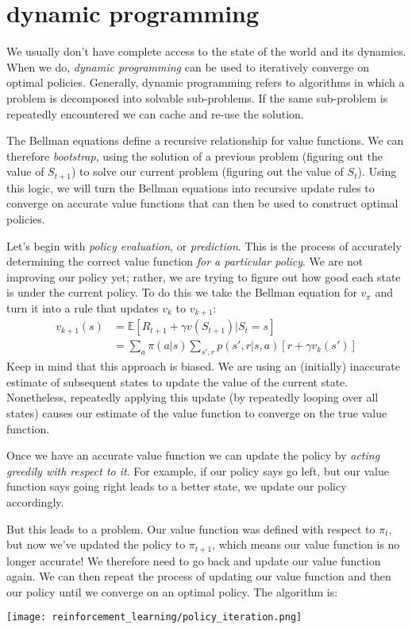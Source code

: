 \section{dynamic programming}
We usually don't have complete access to the state of the world and its dynamics. When we do, \textit{dynamic programming} can be used to iteratively converge on optimal policies. Generally, dynamic programming refers to algorithms in which a problem is decomposed into solvable sub-problems. If the same sub-problem is repeatedly encountered we can cache and re-use the solution.

The Bellman equations define a recursive relationship for value functions. We can therefore \textit{bootstrap}, using the solution of a previous problem (figuring out the value of $S_{t+1}$) to solve our current problem (figuring out the value of $S_{t}$). Using this logic, we will turn the Bellman equations into recursive update rules to converge on accurate value functions that can then be used to construct optimal policies.

Let's begin with \textit{policy evaluation}, or \textit{prediction}. This is the process of accurately determining the correct value function \textit{for a particular policy}. We are not improving our policy yet; rather, we are trying to figure out how good each state is under the current policy. To do this we take the Bellman equation for $v_\pi$ and turn it into a rule that updates $v_k$ to $v_{k+1}$:
\begin{align*}
v_{k+1}(s) &= \mathbb{E}[R_{t+1} + \gamma v(S_{t+1}) | S_t = s] \\
&= \sum_a \pi(a|s) \sum_{s',r} p(s',r|s,a) [r + \gamma v_k(s')]
\end{align*}
Keep in mind that this approach is biased. We are using an (initially) inaccurate estimate of subsequent states to update the value of the current state. Nonetheless, repeatedly applying this update (by repeatedly looping over all states) causes our estimate of the value function to converge on the true value function.

Once we have an accurate value function we can update the policy by \textit{acting greedily with respect to it}. For example, if our policy says go left, but our value function says going right leads to a better state, we update our policy accordingly.

But this leads to a problem. Our value function was defined with respect to $\pi_t$, but now we've updated the policy to $\pi_{t+1}$, which means our value function is no longer accurate! We therefore need to go back and update our value function again. We can then repeat the process of updating our value function and then our policy until we converge on an optimal policy. The algorithm is:
\begin{center}\texttt{[image: reinforcement\_learning/policy\_iteration.png]}\end{center}

